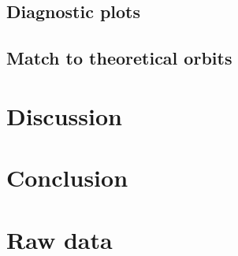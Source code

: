 \documentclass[]{report}
\begin{document}
\section{Diagnostic plots}


\section{Match to theoretical orbits} %



\chapter{Discussion}


\chapter{Conclusion}


\appendix
\chapter{Raw data}

%
%
%
%
%


\end{document}
